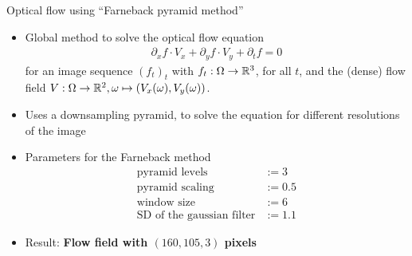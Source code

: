 \begin{frame}{Optical flow using \enquote{Farneback pyramid method}\cite{Farneback2003}}

\begin{itemize}
\item Global method to solve the optical flow equation
\begin{align*}
\partial_x f \cdot V_x + \partial_y f \cdot  V_y + \partial_t f  = 0
\end{align*}
for an image sequence $(f_t)_t$ with $f_t : \Omega \to {\mathbb{R}}^3$, for all $t$, and the (dense) flow field $V : \Omega \to {\mathbb{R}}^2, \omega \mapsto (V_x(\omega), V_y(\omega))$.
\item Uses a downsampling pyramid, to solve the equation for different resolutions of the image
\item Parameters for the Farneback method
\begin{align*}
\text{pyramid levels} &:= 3\\
\text{pyramid scaling} &:= 0.5\\
\text{window size} &:= 6\\
\text{SD of the gaussian filter} &:= 1.1
\end{align*}
\item Result: \textbf{Flow field with $(160,105,3)$ pixels}
\end{itemize}
\end{frame}

